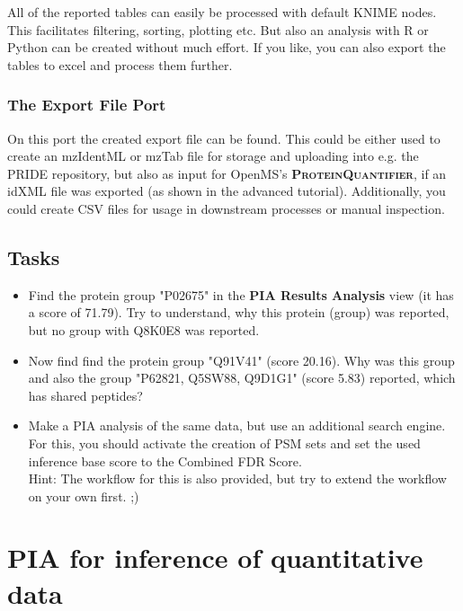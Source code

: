\documentclass[a4paper,11pt,twoside]{article}
\newcommand{\knimenode}[1]{{\scshape\bfseries #1}}
\begin{document}
All of the reported tables can easily be processed with default KNIME nodes.
This facilitates filtering, sorting, plotting etc. But also an analysis with R
or Python can be created without much effort. If you like, you can also export
the tables to excel and process them further.


\subsubsection{The Export File Port}

On this port the created export file can be found. This could be either used
to create an mzIdentML or mzTab file for storage and uploading into e.g. the
PRIDE repository, but also as input for OpenMS's \knimenode{ProteinQuantifier},
if an idXML file was exported (as shown in the advanced tutorial).
Additionally, you could create CSV files for usage in downstream processes or
manual inspection.


\subsection{Tasks}

\begin{itemize}
	\item Find the protein group "P02675" in the \textbf{PIA Results Analysis}
	view (it has a score of 71.79). Try to understand, why this protein (group)
	was reported, but no group with Q8K0E8 was reported.

	\item Now find find the protein group "Q91V41" (score 20.16). Why
	was this group and also the group "P62821, Q5SW88, Q9D1G1" (score 5.83)
	reported, which has shared peptides?

	\item Make a PIA analysis of the same data, but use an additional search
	engine. For this, you should activate the creation of PSM sets and set the
	used inference base score to the Combined FDR Score.\\
	Hint: The workflow for this is also provided, but try to extend the
	workflow on your own first. ;)
\end{itemize}



\newpage
\section{PIA for inference of quantitative data}
\end{document}
